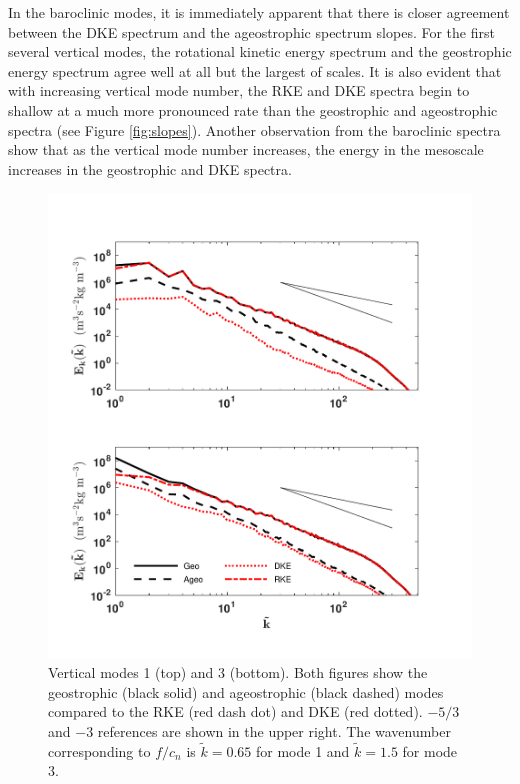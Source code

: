In the baroclinic modes, it is immediately apparent that there is closer agreement between the DKE spectrum and the ageostrophic spectrum slopes. For the first several vertical modes, the rotational kinetic energy spectrum and the geostrophic energy spectrum agree well at all but the largest of scales. It is also evident that with increasing vertical mode number, the RKE and DKE spectra begin to shallow at a much more pronounced rate than the geostrophic and ageostrophic spectra (see Figure \ref{fig:slopes}). Another observation from the baroclinic spectra show that as the vertical mode number increases, the energy in the mesoscale increases in the geostrophic and DKE spectra. \\

\begin{figure}[H]
\includegraphics[scale=1]{Chapter4/img/GeoAgeo_RKEDKE_1-3}
\vspace{-3em}
\caption{Vertical modes 1 (top) and 3 (bottom). Both figures show the geostrophic (black solid) and ageostrophic (black dashed) modes compared to the RKE (red dash dot) and DKE (red dotted). $-5/3$ and $-3$ references are shown in the upper right. The wavenumber corresponding to $f/c_n$ is $\tilde{k} = 0.65$ for mode 1 and $\tilde{k} = 1.5$ for mode 3.}
\label{fig:GeoAgeo_RKEDKE_1-3}
\end{figure}


